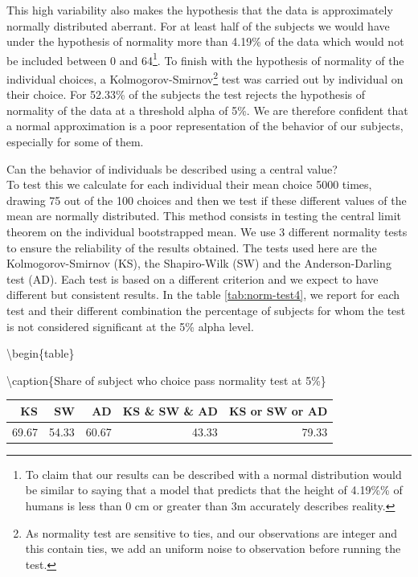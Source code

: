 \documentclass[
]{book}
\begin{document}
This high variability also makes the hypothesis that the data is
approximately normally distributed aberrant.
For at least half of the subjects
we would have under the hypothesis of normality more than
4.19\% of the data which would not be
included between 0 and 64\footnote{To claim that our results can be described with a normal distribution
  would be similar to saying that a model that predicts that the height of
  4.19\%\% of humans is less than 0 cm or greater
  than 3m accurately describes reality.}.
To finish with the hypothesis of normality of the individual choices, a
Kolmogorov-Smirnov\footnote{As normality test are sensitive to ties, and our observations are integer
  and this contain ties, we add an uniform noise to observation before running the
  test.} test was carried out by individual on their choice.
For 52.33\% of the subjects
the test rejects the hypothesis of normality of the data at a threshold
alpha of 5\%.
We are therefore confident that a normal approximation is a poor representation
of the behavior of our subjects, especially for some of them.

Can the behavior of individuals be described using a central value?\\
To test this we calculate for
each individual their mean choice 5000 times, drawing 75 out of the 100 choices
and then we test if these different values of the mean are
normally distributed. This method consists in testing the central limit
theorem on the individual bootstrapped mean. We
use 3 different normality tests to ensure the reliability of the
results obtained. The tests used here are the Kolmogorov-Smirnov
(KS), the Shapiro-Wilk (SW) and the Anderson-Darling test (AD).
Each test is based on a different criterion and we expect to have
different but consistent results. In the table \ref{tab:norm-test4}, we report for each
test and their different combination the percentage of subjects for whom
the test is not considered significant at the 5\% alpha level.

\textbackslash begin\{table\}

\textbackslash caption\{\label{tab:norm-test4}Share of subject who choice pass normality test at 5\%\}
\centering

\begin{tabular}[t]{rrrrr}
\toprule
KS & SW & AD & KS \& SW \& AD & KS or SW or AD\\
\midrule
69.67 & 54.33 & 60.67 & 43.33 & 79.33\\
\bottomrule
\end{tabular}
\end{document}
